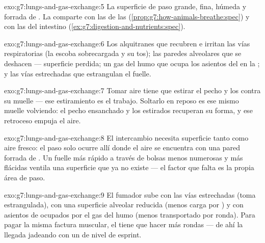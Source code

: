 \begin{solution}{exo:g7:lungs-and-gas-exchange:5}
La superficie de paso grande, fina, húmeda y forrada de . La
comparte con las  de las 
(\cref{prop:g7:how-animals-breathe:spec}) y con las  del
intestino (\cref{ex:g7:digestion-and-nutrients:spec}).
\end{solution}

\begin{solution}{exo:g7:lungs-and-gas-exchange:6}
Los alquitranes que recubren e irritan las vías respiratorias (la
escoba sobrecargada y su tos); las paredes alveolares que se deshacen
--- superficie perdida; un gas del humo que ocupa los asientos del
 en la ; y las vías estrechadas que estrangulan el fuelle.
\end{solution}

\begin{solution}{exo:g7:lungs-and-gas-exchange:7}
Tomar aire tiene que estirar el pecho y los  contra su muelle
--- ese estiramiento es el trabajo. Soltarlo en reposo es ese mismo
muelle volviendo: el pecho ensanchado y los  estirados
recuperan su forma, y ese retroceso empuja el aire.
\end{solution}

\begin{solution}{exo:g7:lungs-and-gas-exchange:8}
El intercambio necesita superficie tanto como aire fresco: el paso solo
ocurre allí donde el aire se encuentra con una pared forrada de .
Un fuelle más rápido a través de bolsas menos numerosas y más flácidas
ventila una superficie que ya no existe --- el factor que falta es la
propia área de paso.
\end{solution}

\begin{solution}{exo:g7:lungs-and-gas-exchange:9}
El fumador sube con las vías estrechadas (toma estrangulada), con una
superficie alveolar reducida (menos carga por ) y con
asientos de  ocupados por el gas del humo (menos transportado
por ronda). Para pagar la misma factura muscular, el  tiene que
hacer más rondas --- de ahí la llegada jadeando con un  de nivel
de esprint.
\end{solution}

